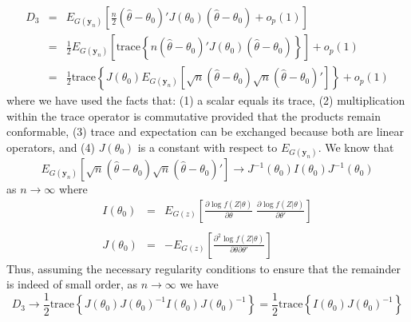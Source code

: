 \documentclass[12pt]{article}
\theoremstyle{definition}
\begin{document}
	\begin{eqnarray*}
		D_3 &=& E_{G(\mathbf{y}_n)}\left[  \frac{n}{2} \left( \hat{\theta}- \theta_0\right)'J(\theta_0)\left(\hat{\theta}- \theta_0\right) + o_p(1)  \right]\\
		&=& \frac{1}{2} E_{G(\mathbf{y}_n)}\left[ \mbox{trace}\left\{n\left( \hat{\theta}- \theta_0\right)'J(\theta_0)\left(\hat{\theta}- \theta_0\right) \right\} \right] +o_p(1)\\
			&=& \frac{1}{2}\mbox{trace}\left\{J(\theta_0) E_{G(\mathbf{y}_n)}\left[\sqrt{n} \left( \hat{\theta}- \theta_0\right)\sqrt{n}\left(\hat{\theta}- \theta_0\right)' \right]\right\} +o_p(1)
	\end{eqnarray*}
where we have used the facts that: (1) a scalar equals its trace, (2) multiplication within the trace operator is commutative provided that the products remain conformable, (3) trace and expectation can be exchanged because both are linear operators, and (4) $J(\theta_0)$ is a constant with respect to $E_{G(\mathbf{y}_n)}$. We know that
	$$E_{G(\mathbf{y}_n)}\left[\sqrt{n} \left( \hat{\theta}- \theta_0\right)\sqrt{n}\left(\hat{\theta}- \theta_0\right)' \right]\rightarrow J^{-1}(\theta_0) I(\theta_0)J^{-1}(\theta_0)$$
as $n\rightarrow \infty$ where
	\begin{eqnarray*}
	I(\theta_0) &=&E_{G(z)}\left[ \frac{\partial \log{f(Z|\theta)}}{\partial \theta} \;\frac{\partial \log{f(Z|\theta)}}{\partial \theta'} \right]\\\\
	J(\theta_0) &=& - E_{G(z)}\left[ \frac{\partial^2  \log{f(Z|\theta)}}{\partial \theta \partial \theta'}\right]
	\end{eqnarray*}
Thus, assuming the necessary regularity conditions to ensure that the remainder is indeed of small order, as $n\rightarrow \infty$ we have
	$$D_3 \rightarrow \frac{1}{2} \mbox{trace}\left\{ J(\theta_0) J(\theta_0)^{-1}I(\theta_0)J(\theta_0)^{-1}  \right\} = \frac{1}{2}\mbox{trace}\left\{ I(\theta_0)J(\theta_0)^{-1} \right\}$$
\end{document}
